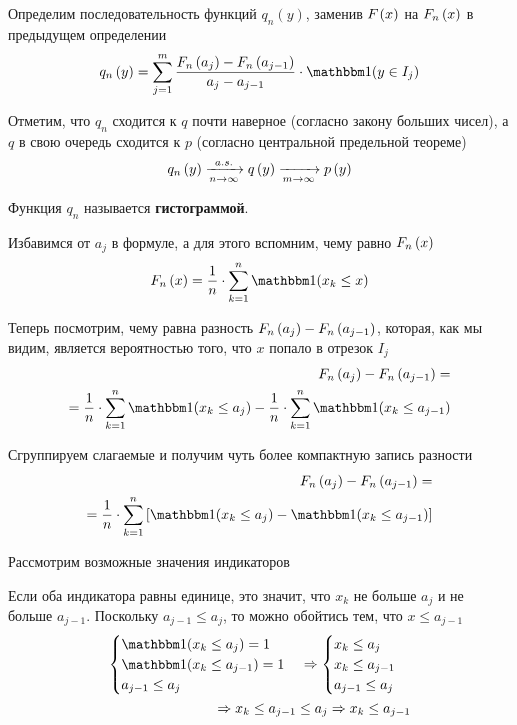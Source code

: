 Определим последовательность функций $q_n\left(y\right)$,
заменив $F_{}\left(x\right)$ на $F_n\left(x\right)$ в предыдущем определении
\begin{equation}\label{eq:histogram_start}
q_n\left(y\right)
=\sum_{j=1}^m \frac{\cdfn{a_j}-\cdfn{a_{j-1}}}{a_j-a_{j-1}}
    \cdot\indicator{y\in I_j}
\end{equation}

Отметим, что
$q_n$ сходится к $q$ почти наверное (согласно закону больших чисел),
а $q$ в свою очередь сходится к $p$ (согласно центральной предельной теореме)
$$q_n\left(y\right)\xrightarrow[n\to\infty]{a.s.} q\left(y\right)\xrightarrow[m\to\infty]{}p\left(y\right)$$

Функция $q_n$ называется \textbf{гистограммой}.

Избавимся от $a_j$ в формуле, а для этого вспомним, чему равно $F_n\left(x\right)$
$$\cdfn{x}=\frac{1}{n}\cdot \sum_{k=1}^n
\indicator{x_k\le x}$$

Теперь посмотрим, чему равна разность $F_n\left(a_j\right)-F_n\left(a_{j-1}\right)$,
которая, как мы видим, является вероятностью того,
что $x$ попало в отрезок $I_j$
\begin{align*}
    \cdfn{a_j}-\cdfn{a_{j-1}}=\\
    =\frac{1}{n}\cdot \sum_{k=1}^n
        \indicator{x_k\le a_j}-\frac{1}{n}\cdot \sum_{k=1}^n
        \indicator{x_k\le a_{j-1}}
\end{align*}

Сгруппируем слагаемые и получим чуть более компактную запись разности
\begin{eqnarray}\label{eq:cdfn_difference}
    \cdfn{a_j}-\cdfn{a_{j-1}}=\nonumber\\
    =\frac{1}{n}\cdot \sum_{k=1}^n
        \left[\indicator{x_k\le a_j}-\indicator{x_k\le a_{j-1}}\right]
\end{eqnarray}

Рассмотрим возможные значения индикаторов

Если оба индикатора равны единице,
это значит, что $x_k$ не больше $a_j$ и не больше $a_{j-1}$.
Поскольку $a_{j-1}\le a_j$, то можно обойтись тем, что $x\le a_{j-1}$
\begin{align*}
    \begin{cases}
        \indicator{x_k\le a_j}=1\\
        \indicator{x_k\le a_{j-1}}=1\\
        a_{j-1}\le a_j
    \end{cases}
    \Rightarrow
    \begin{cases}
        x_k\le a_j\\
        x_k\le a_{j-1}\\
        a_{j-1}\le a_j
    \end{cases}
    \\\Rightarrow
        x_k\le a_{j-1}\le a_j
    \Rightarrow
        x_k\le a_{j-1}
\end{align*}

